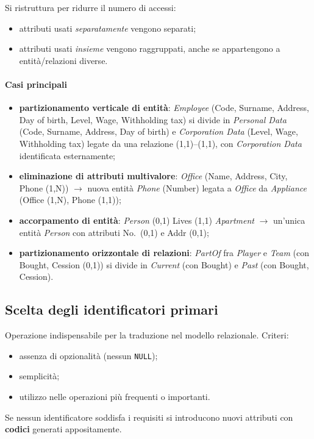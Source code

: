 \documentclass[a4paper,12pt]{article}
\begin{document}
Si ristruttura per ridurre il numero di accessi:
\begin{itemize}
  \item attributi usati \emph{separatamente} vengono separati;
  \item attributi usati \emph{insieme} vengono raggruppati, anche se
    appartengono a entità/relazioni diverse.
\end{itemize}

\paragraph{Casi principali}
\begin{itemize}
  \item \textbf{partizionamento verticale di entità}: \emph{Employee} (Code,
    Surname, Address, Day of birth, Level, Wage, Withholding tax) si divide in
    \emph{Personal Data} (Code, Surname, Address, Day of birth) e
    \emph{Corporation Data} (Level, Wage, Withholding tax) legate da una
    relazione (1,1)--(1,1), con \emph{Corporation Data} identificata
    esternamente;
  \item \textbf{eliminazione di attributi multivalore}: \emph{Office} (Name,
    Address, City, Phone (1,N)) $\to$ nuova entità \emph{Phone} (Number)
    legata a \emph{Office} da \emph{Appliance} (Office (1,N), Phone (1,1));
  \item \textbf{accorpamento di entità}: \emph{Person} (0,1) Lives (1,1)
    \emph{Apartment} $\to$ un'unica entità \emph{Person} con attributi No.\
    (0,1) e Addr (0,1);
  \item \textbf{partizionamento orizzontale di relazioni}: \emph{PartOf} fra
    \emph{Player} e \emph{Team} (con Bought, Cession (0,1)) si divide in
    \emph{Current} (con Bought) e \emph{Past} (con Bought, Cession).
\end{itemize}

\subsection{Scelta degli identificatori primari}

Operazione indispensabile per la traduzione nel modello relazionale. Criteri:
\begin{itemize}
  \item assenza di opzionalità (nessun \texttt{NULL});
  \item semplicità;
  \item utilizzo nelle operazioni più frequenti o importanti.
\end{itemize}
Se nessun identificatore soddisfa i requisiti si introducono nuovi attributi
con \textbf{codici} generati appositamente.
\end{document}
